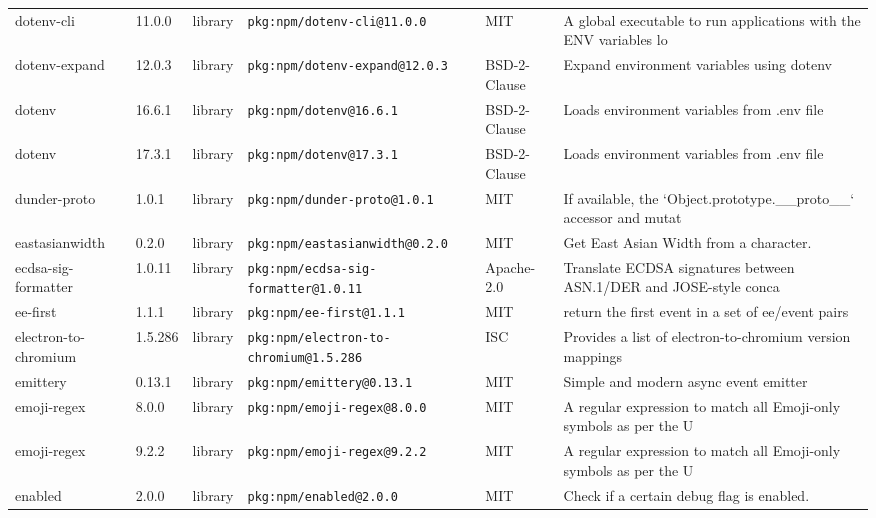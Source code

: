 \documentclass[11pt,a4paper]{article}
\begin{document}
\begin{longtable}{|p{4cm}|p{2cm}|p{1.6cm}|p{5cm}|p{1.5cm}|p{3.5cm}|}
\raggedright dotenv-cli & 11.0.0 & library & \small\texttt{pkg:npm/dotenv-cli@11.0.0} & MIT & \small A global executable to run applications with the ENV variables lo \\
\raggedright dotenv-expand & 12.0.3 & library & \small\texttt{pkg:npm/dotenv-expand@12.0.3} & BSD-2-Clause & \small Expand environment variables using dotenv \\
\raggedright dotenv & 16.6.1 & library & \small\texttt{pkg:npm/dotenv@16.6.1} & BSD-2-Clause & \small Loads environment variables from .env file \\
\raggedright dotenv & 17.3.1 & library & \small\texttt{pkg:npm/dotenv@17.3.1} & BSD-2-Clause & \small Loads environment variables from .env file \\
\raggedright dunder-proto & 1.0.1 & library & \small\texttt{pkg:npm/dunder-proto@1.0.1} & MIT & \small If available, the `Object.prototype.\_\_proto\_\_` accessor and mutat \\
\raggedright eastasianwidth & 0.2.0 & library & \small\texttt{pkg:npm/eastasianwidth@0.2.0} & MIT & \small Get East Asian Width from a character. \\
\raggedright ecdsa-sig-formatter & 1.0.11 & library & \small\texttt{pkg:npm/ecdsa-sig-formatter@1.0.11} & Apache-2.0 & \small Translate ECDSA signatures between ASN.1/DER and JOSE-style conca \\
\raggedright ee-first & 1.1.1 & library & \small\texttt{pkg:npm/ee-first@1.1.1} & MIT & \small return the first event in a set of ee/event pairs \\
\raggedright electron-to-chromium & 1.5.286 & library & \small\texttt{pkg:npm/electron-to-chromium@1.5.286} & ISC & \small Provides a list of electron-to-chromium version mappings \\
\raggedright emittery & 0.13.1 & library & \small\texttt{pkg:npm/emittery@0.13.1} & MIT & \small Simple and modern async event emitter \\
\raggedright emoji-regex & 8.0.0 & library & \small\texttt{pkg:npm/emoji-regex@8.0.0} & MIT & \small A regular expression to match all Emoji-only symbols as per the U \\
\raggedright emoji-regex & 9.2.2 & library & \small\texttt{pkg:npm/emoji-regex@9.2.2} & MIT & \small A regular expression to match all Emoji-only symbols as per the U \\
\raggedright enabled & 2.0.0 & library & \small\texttt{pkg:npm/enabled@2.0.0} & MIT & \small Check if a certain debug flag is enabled. \\

\end{longtable}
\end{document}
